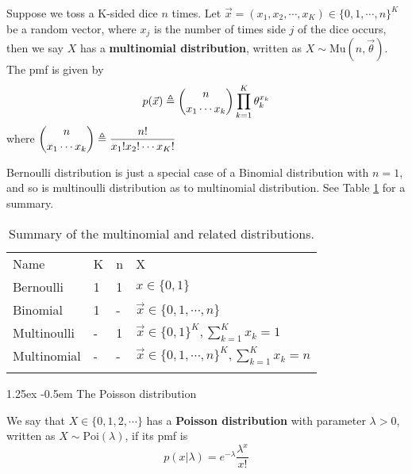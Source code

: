 \documentclass[8pt]{article}
\makeatletter
\newlength{\norm}
\newlength{\nrm}
\newlength{\sm}
\renewcommand{\paragraph}{%
  \@startsection{paragraph}{4}%
  {\z@}{1.25ex \@plus 2pt \@minus 2pt}{-0.5em}%
  {\fontsize{\f@size}{\nrm}\normalfont\bfseries}%
}
\makeatother
\begin{document}
\begin{definition}
Suppose we toss a K-sided dice $n$ times. Let $\vec{x} =(x_1,x_2,\cdots,x_K) \in \{0,1,\cdots,n\}^K$ be a random vector, where $x_j$ is the number of times side $j$ of the dice occurs, then we say $X$ has a \textbf{multinomial distribution}, written as $X \sim \text{Mu}(n, \vec{\theta})$. The pmf is given by 
\begin{equation}\label{eqn:multinomial-pmf}
p(\vec{x}) \triangleq \dbinom{n}{x_1 \cdots x_k} \prod\limits_{k=1}^K\theta_k^{x_k}
\end{equation}
where $\dbinom{n}{x_1 \cdots x_k} \triangleq \dfrac{n!}{x_1!x_2! \cdots x_K!}$
\end{definition}

Bernoulli distribution is just a special case of a Binomial distribution with $n=1$, and so is multinoulli distribution as to multinomial distribution. See Table \ref{tab:multinomial-summary} for a summary.

\begin{table}
\caption{Summary of the multinomial and related distributions.}
\label{tab:multinomial-summary}
\centering
\begin{tabular}{llll}
\hline\noalign{\smallskip}
Name & K & n & X \\
\noalign{\smallskip}\svhline\noalign{\smallskip}
Bernoulli & 1 & 1 & $x \in \{0,1\}$ \\
Binomial & 1 & - & $\vec{x} \in \{0,1,\cdots,n\}$ \\
Multinoulli & - & 1 & $\vec{x} \in \{0,1\}^K, \sum_{k=1}^K x_k=1$ \\
Multinomial & - & - & $\vec{x} \in \{0,1,\cdots,n\}^K, \sum_{k=1}^K x_k=n$ \\
\noalign{\smallskip}\hline
\end{tabular}
\end{table} 


\paragraph{The Poisson distribution}
\begin{definition}
We say that $X \in \{0,1,2,\cdots\}$ has a \textbf{Poisson distribution} with parameter $\lambda>0$, written as $X \sim \text{Poi}(\lambda)$, if its pmf is
\begin{equation}
p(x|\lambda)=e^{-\lambda}\dfrac{\lambda^x}{x!}
\end{equation}
\end{definition}
\end{document}
